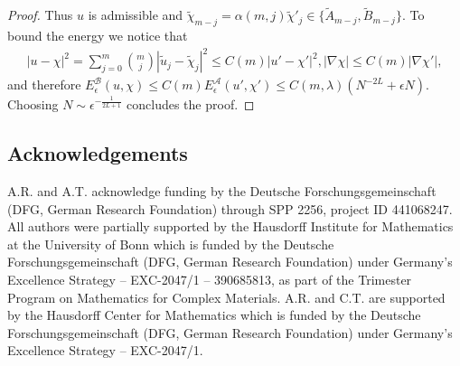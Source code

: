 \documentclass[a4paper, 10pt, twoside, notitlepage]{amsart}
\theoremstyle{plain}
\newcommand{\A}{\mathcal{A}}
\begin{document}
\begin{proof}
                    Thus $u$ is admissible and $\tilde{\chi}_{m-j} = \alpha(m,j) \tilde{\chi}'_j \in \{\tilde{A}_{m-j},\tilde{B}_{m-j}\}$.
                    To bound the energy we notice that
                    \begin{align*}
                      |u-\chi|^2 = \sum_{j=0}^m \binom{m}{j} |\tilde{u}_j - \tilde{\chi}_j|^2 \leq C(m) |u'-\chi'|^2, |\nabla \chi| \leq C(m) |\nabla \chi'|,
                    \end{align*}
                    and therefore $E_\epsilon^{\mathcal{B}}(u,\chi) \leq C(m) E_\epsilon^{\A}(u',\chi') \leq C(m,\lambda) (N^{-2L} + \epsilon N)$.
                    Choosing $N \sim \epsilon^{-\frac{1}{2L+1}}$ concludes the proof.
                  \end{proof}
                
		\subsection*{Acknowledgements}
		A.R. and A.T. acknowledge funding by the Deutsche Forschungsgemeinschaft (DFG, German Research Foundation) through SPP 2256, project ID 441068247. 
		All authors were partially supported by the Hausdorff Institute for Mathematics at the University of Bonn which is funded by the Deutsche Forschungsgemeinschaft (DFG, German Research Foundation) under Germany's Excellence Strategy – EXC-2047/1 – 390685813, as part of the Trimester Program on Mathematics for Complex Materials. A.R. and C.T. are supported by the Hausdorff Center for Mathematics which is funded by the Deutsche Forschungsgemeinschaft (DFG, German Research Foundation) under Germany's Excellence Strategy – EXC-2047/1.
		
		 
		
	
\end{document}
